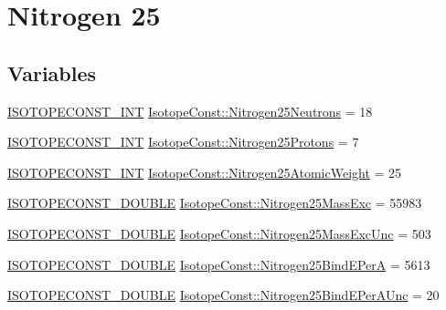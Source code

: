 \hypertarget{group___isotope_const-_nitrogen-_n25}{}\section{Nitrogen 25}
\label{group___isotope_const-_nitrogen-_n25}
\subsection*{Variables}
\begin{DoxyCompactItemize}
\item 
\mbox{\hyperlink{group___isotope_const-_macros_ga5f18360b3e99483a35c32d789e62621c}{I\+S\+O\+T\+O\+P\+E\+C\+O\+N\+S\+T\+\_\+\+I\+NT}} \mbox{\hyperlink{group___isotope_const-_nitrogen-_n25_ga32e518430646b601cda83c3145171c98}{Isotope\+Const\+::\+Nitrogen25\+Neutrons}} = 18
\item 
\mbox{\hyperlink{group___isotope_const-_macros_ga5f18360b3e99483a35c32d789e62621c}{I\+S\+O\+T\+O\+P\+E\+C\+O\+N\+S\+T\+\_\+\+I\+NT}} \mbox{\hyperlink{group___isotope_const-_nitrogen-_n25_ga70fe31dac4ef006da9ae6030fe2e6169}{Isotope\+Const\+::\+Nitrogen25\+Protons}} = 7
\item 
\mbox{\hyperlink{group___isotope_const-_macros_ga5f18360b3e99483a35c32d789e62621c}{I\+S\+O\+T\+O\+P\+E\+C\+O\+N\+S\+T\+\_\+\+I\+NT}} \mbox{\hyperlink{group___isotope_const-_nitrogen-_n25_ga49dd756a1aedd55c52a2b4e43557ad5b}{Isotope\+Const\+::\+Nitrogen25\+Atomic\+Weight}} = 25
\item 
\mbox{\hyperlink{group___isotope_const-_macros_ga8f45a7272ce02c0b4c65c44636ed719a}{I\+S\+O\+T\+O\+P\+E\+C\+O\+N\+S\+T\+\_\+\+D\+O\+U\+B\+LE}} \mbox{\hyperlink{group___isotope_const-_nitrogen-_n25_gaff9abc8665fb54008b8a01577d60c3a1}{Isotope\+Const\+::\+Nitrogen25\+Mass\+Exc}} = 55983
\item 
\mbox{\hyperlink{group___isotope_const-_macros_ga8f45a7272ce02c0b4c65c44636ed719a}{I\+S\+O\+T\+O\+P\+E\+C\+O\+N\+S\+T\+\_\+\+D\+O\+U\+B\+LE}} \mbox{\hyperlink{group___isotope_const-_nitrogen-_n25_gaf69788f922c47e4a3ea6f9b94bc777a3}{Isotope\+Const\+::\+Nitrogen25\+Mass\+Exc\+Unc}} = 503
\item 
\mbox{\hyperlink{group___isotope_const-_macros_ga8f45a7272ce02c0b4c65c44636ed719a}{I\+S\+O\+T\+O\+P\+E\+C\+O\+N\+S\+T\+\_\+\+D\+O\+U\+B\+LE}} \mbox{\hyperlink{group___isotope_const-_nitrogen-_n25_ga3747b4cff33409037641e0f3c75ba839}{Isotope\+Const\+::\+Nitrogen25\+Bind\+E\+PerA}} = 5613
\item 
\mbox{\hyperlink{group___isotope_const-_macros_ga8f45a7272ce02c0b4c65c44636ed719a}{I\+S\+O\+T\+O\+P\+E\+C\+O\+N\+S\+T\+\_\+\+D\+O\+U\+B\+LE}} \mbox{\hyperlink{group___isotope_const-_nitrogen-_n25_ga090b553d8e6c376676e102de688aea07}{Isotope\+Const\+::\+Nitrogen25\+Bind\+E\+Per\+A\+Unc}} = 20

\end{DoxyCompactItemize}
